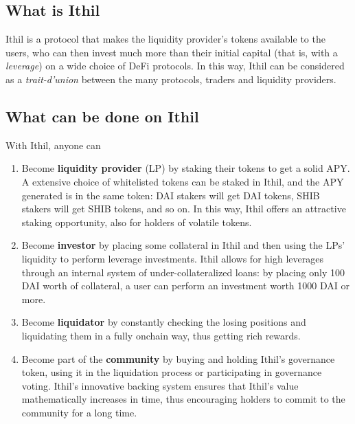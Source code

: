 \documentclass[a4paper,10 pt]{article}
\theoremstyle{definition}
\begin{document}
\subsection{What is Ithil}
Ithil is a protocol that makes the liquidity provider's tokens available to the users, who can then invest much more than their initial capital (that is, with a {\it leverage}) on a wide choice of DeFi protocols. In this way, Ithil can be considered as a {\it trait-d'union} between the many protocols, traders and liquidity providers.

\subsection{What can be done on Ithil}
With Ithil, anyone can
\begin{enumerate}
\item Become {\bf liquidity provider} (LP) by staking their tokens to get a solid APY. A extensive choice of whitelisted tokens can be staked in Ithil, and the APY generated is in the same token: DAI stakers will get DAI tokens, SHIB stakers will get SHIB tokens, and so on. In this way, Ithil offers an attractive staking opportunity, also for holders of volatile tokens.
\item Become {\bf investor} by placing some collateral in Ithil and then using the LPs' liquidity to perform leverage investments. Ithil allows for high leverages through an internal system of under-collateralized loans: by placing only 100 DAI worth of collateral, a user can perform an investment worth 1000 DAI or more.
\item Become {\bf liquidator} by constantly checking the losing positions and liquidating them in a fully onchain way, thus getting rich rewards.
\item Become part of the {\bf community} by buying and holding Ithil's governance token, using it in the liquidation process or participating in governance voting. Ithil's innovative backing system ensures that Ithil's value mathematically increases in time, thus encouraging holders to commit to the community for a long time.
\end{enumerate}
\end{document}
